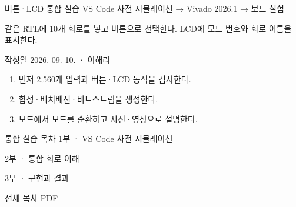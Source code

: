
\renewcommand{\labonehome}{\hyperlink{integrated-vivado-contents}{\contentsbutton}}
\renewcommand{\legacySource}[1]{}
\providecommand{\terminalbox}[1]{\par\vspace{0.15cm}{\setlength{\fboxsep}{7pt}\colorbox{black}{\parbox{\dimexpr\textwidth-14pt\relax}{\color{white}\ttfamily\fontsize{7}{9}\selectfont #1}}}\par\vspace{0.15cm}}

\begingroup
\renewcommand{\small}{\fontsize{9}{11}\selectfont}
\begin{frame}{버튼·LCD 통합 실습}\relax
\small
VS Code 사전 시뮬레이션 → Vivado 2026.1 → 보드 실험\par\vspace{0.22cm}같은 RTL에 10개 회로를 넣고 버튼으로 선택한다. LCD에 모드 번호와 회로 이름을 표시한다.\par\vspace{0.22cm}작성일 2026. 09. 10. · 이해리\par\begin{enumerate}\setlength{\itemsep}{0.22cm}
\item 먼저 2,560개 입력과 버튼·LCD 동작을 검사한다.
\item 합성·배치배선·비트스트림을 생성한다.
\item 보드에서 모드를 순환하고 사진·영상으로 설명한다.
\end{enumerate}

\end{frame}

\begin{frame}[label=integrated-vivado-contents]{통합 실습 목차}\relax
\small
1부 · VS Code 사전 시뮬레이션\par{}\par\vspace{0.4cm}
2부 · 통합 회로 이해\par{}\par\vspace{0.4cm}
3부 · 구현과 결과\par{}\par\vspace{0.2cm}
\par\vspace{0.3cm}
\href{04.LAB1_00_CONTENTS.pdf}{전체 목차 PDF}
\end{frame}

